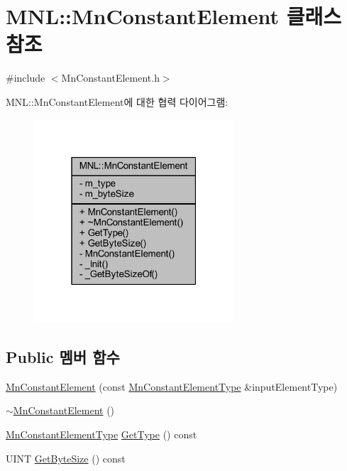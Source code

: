 \hypertarget{class_m_n_l_1_1_mn_constant_element}{}\section{M\+NL\+:\+:Mn\+Constant\+Element 클래스 참조}
\label{class_m_n_l_1_1_mn_constant_element}


{\ttfamily \#include $<$Mn\+Constant\+Element.\+h$>$}



M\+NL\+:\+:Mn\+Constant\+Element에 대한 협력 다이어그램\+:\nopagebreak
\begin{figure}[H]
\begin{center}
\leavevmode
\includegraphics[width=211pt]{class_m_n_l_1_1_mn_constant_element__coll__graph}
\end{center}
\end{figure}
\subsection*{Public 멤버 함수}
\begin{DoxyCompactItemize}
\item 
\hyperlink{class_m_n_l_1_1_mn_constant_element_acf2d83e71ba0f23f91eb704bab1a3c44}{Mn\+Constant\+Element} (const \hyperlink{namespace_m_n_l_a7d0c6fcd5ada7e43f4059b8a9b4afb49}{Mn\+Constant\+Element\+Type} \&input\+Element\+Type)
\item 
\hyperlink{class_m_n_l_1_1_mn_constant_element_a3bde989f21552b8cc4e027934a7cd766}{$\sim$\+Mn\+Constant\+Element} ()
\item 
\hyperlink{namespace_m_n_l_a7d0c6fcd5ada7e43f4059b8a9b4afb49}{Mn\+Constant\+Element\+Type} \hyperlink{class_m_n_l_1_1_mn_constant_element_adf574d682e379192b4f84e108f22b31f}{Get\+Type} () const
\item 
U\+I\+NT \hyperlink{class_m_n_l_1_1_mn_constant_element_a9db6b1f129ac9630959bf8b9c3cff804}{Get\+Byte\+Size} () const
\end{DoxyCompactItemize}
